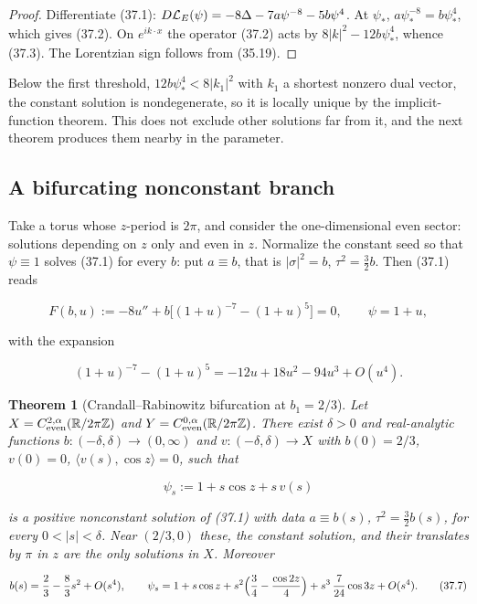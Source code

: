 \documentclass[11pt]{article}
\newtheorem{theorem}{Theorem}[section]
\theoremstyle{remark}
\begin{document}
\begin{proof}
Differentiate (37.1): \(D{\cal L}_E(\psi)=-8\Delta-7a\psi^{-8}-5b\psi^4\).
At \(\psi_*\), \(a\psi_*^{-8}=b\psi_*^{4}\), which gives (37.2).  On
\(e^{ik\cdot x}\) the operator (37.2) acts by \(8|k|^2-12b\psi_*^4\),
whence (37.3).  The Lorentzian sign follows from (35.19).
\end{proof}

Below the first threshold, \(12b\psi_*^4<8|k_1|^2\) with \(k_1\) a
shortest nonzero dual vector, the constant solution is nondegenerate,
so it is locally unique by the implicit-function theorem.  This does
not exclude other solutions far from it, and the next theorem produces
them nearby in the parameter.

\subsection{A bifurcating nonconstant branch}

Take a torus whose \(z\)-period is \(2\pi\), and consider the
one-dimensional even sector: solutions depending on \(z\) only and even
in \(z\).  Normalize the constant seed so that \(\psi\equiv1\) solves
(37.1) for every \(b\): put \(a\equiv b\), that is
\(|\sigma|^2=b\), \(\tau^2=\tfrac32b\).  Then (37.1) reads

\[
 F(b,u):=-8u''+b\bigl[(1+u)^{-7}-(1+u)^5\bigr]=0,
 \qquad\psi=1+u,                                                  \tag{37.4}
\]

with the expansion

\[
 (1+u)^{-7}-(1+u)^5=-12u+18u^2-94u^3+O(u^4).                     \tag{37.5}
\]

\begin{theorem}[Crandall--Rabinowitz bifurcation at \(b_1=2/3\)]
\label{thm:v19v34-bifurcation}
Let \(X=C^{2,\alpha}_{\rm even}(\mathbb R/2\pi\mathbb Z)\) and
\(Y=C^{0,\alpha}_{\rm even}(\mathbb R/2\pi\mathbb Z)\).  There exist
\(\delta>0\) and real-analytic functions \(b:(-\delta,\delta)\to(0,\infty)\)
and \(v:(-\delta,\delta)\to X\) with \(b(0)=2/3\), \(v(0)=0\),
\(\langle v(s),\cos z\rangle=0\), such that

\[
 \psi_s:=1+s\cos z+s\,v(s)                                         \tag{37.6}
\]

is a positive nonconstant solution of (37.1) with data
\(a\equiv b(s)\), \(\tau^2=\tfrac32b(s)\), for every \(0<|s|<\delta\).
Near \((2/3,0)\) these, the constant solution, and their translates by
\(\pi\) in \(z\) are the only solutions in \(X\).  Moreover

\[
 b(s)=\frac23-\frac83s^2+O(s^4),\qquad
 \psi_s=1+s\cos z+s^2\Bigl(\frac34-\frac{\cos2z}4\Bigr)
 +s^3\,\frac{7}{24}\cos3z+O(s^4).                                  \tag{37.7}
\]
\end{theorem}
\end{document}
